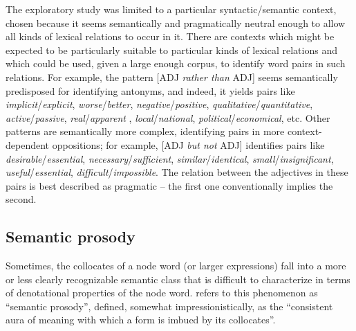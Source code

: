 The exploratory  study was limited to a particular syntactic\slash semantic  context, chosen because it seems semantically and pragmatically  neutral enough to allow all kinds of lexical relations to occur in it. There are contexts which might be expected to be particularly suitable to particular kinds of lexical relations and which could be used, given a large  enough corpus, to identify word pairs in such relations. For example, the pattern [ADJ \textit{rather than} ADJ] seems semantically predisposed for identifying antonyms,  and indeed, it yields pairs like \textit{implicit}\slash \textit{explicit}, \textit{worse}\slash \textit{better}, \textit{negative}\slash \textit{positive}, \textit{qualitative}\slash \textit{quantitative}, \textit{active}\slash \textit{passive}, \textit{real}\slash \textit{ap\-parent }, \textit{local}\slash \textit{national}, \textit{political}\slash \textit{economical}, etc. Other patterns are semantically more complex, identifying pairs in more context\hyp{}dependent oppositions; for example, [ADJ \textit{but not} ADJ] identifies pairs like \textit{desirable}\slash \textit{essential}, \textit{necessary}\slash \textit{sufficient}, \textit{similar}\slash \textit{identical}, \textit{small}\slash \textit{insignificant}, \textit{useful}\slash \textit{essential}, \textit{difficult}\slash \textit{impossible}. The relation between the adjectives  in these pairs is best described as pragmatic  -- the first one conventionally  implies the second.

\subsection{Semantic prosody}
\label{sec:semanticprosody}

Sometimes, the collocates  of a node word (or larger expressions) fall into a more or less clearly recognizable semantic  class that is difficult to characterize in terms of denotational properties of the node word. \citet[157]{louw_irony_1993} refers to this phenomenon as ``semantic prosody'', defined, somewhat impressionistically, as the ``consistent aura of meaning with which a form is imbued by its  collocates''.

